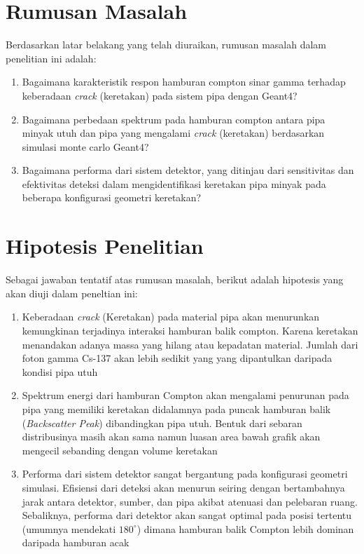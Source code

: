 \documentclass[12pt,a4paper]{report}
\begin{document}
\section{Rumusan Masalah}
Berdasarkan latar belakang yang telah diuraikan, rumusan masalah dalam penelitian ini adalah:
\begin{enumerate}
    \item Bagaimana karakteristik respon hamburan compton sinar gamma terhadap keberadaan \textit{crack} (keretakan) pada sistem pipa dengan Geant4?
    \item Bagaimana perbedaan spektrum pada hamburan compton antara pipa minyak utuh dan pipa yang mengalami \textit{crack} (keretakan) berdasarkan simulasi monte carlo Geant4?
    \item Bagaimana performa dari sistem detektor, yang ditinjau dari sensitivitas dan efektivitas deteksi dalam mengidentifikasi keretakan pipa minyak pada beberapa konfigurasi geometri keretakan?
\end{enumerate}

\section{Hipotesis Penelitian}
Sebagai jawaban tentatif atas rumusan masalah, berikut adalah hipotesis yang akan diuji dalam peneltian ini:
\begin{enumerate}
    \item Keberadaan \textit{crack} (Keretakan) pada material pipa akan menurunkan kemungkinan terjadinya interaksi hamburan balik compton. Karena keretakan menandakan adanya massa yang hilang atau kepadatan material. Jumlah dari foton gamma Cs-137 akan lebih sedikit yang
    yang dipantulkan daripada kondisi pipa utuh
    \item Spektrum energi dari hamburan Compton akan mengalami penurunan pada pipa yang memiliki keretakan didalamnya pada puncak hamburan balik (\textit{Backscatter Peak}) dibandingkan pipa utuh. Bentuk dari sebaran distribusinya masih akan sama namun luasan area bawah grafik akan mengecil sebanding dengan volume keretakan
    \item Performa dari sistem detektor sangat bergantung pada konfigurasi geometri simulasi. Efisiensi dari deteksi akan menurun seiring dengan bertambahnya jarak antara detektor, sumber, dan pipa akibat atenuasi dan pelebaran ruang. Sebaliknya, performa dari detektor akan sangat optimal pada posisi tertentu (umumnya mendekati $180^\circ$)
    dimana hamburan balik Compton lebih dominan daripada hamburan acak
\end{enumerate}
\end{document}
